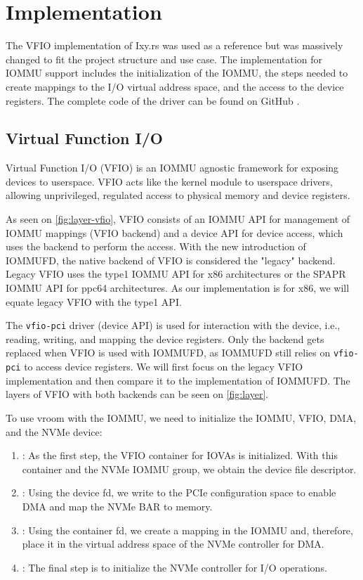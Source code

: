 \chapter{Implementation} \label{c:impl}

The VFIO implementation of Ixy.rs was used as a reference but was massively changed to fit the project structure and use case. The implementation for IOMMU support includes the initialization of the IOMMU, the steps needed to create mappings to the I/O virtual address space, and the access to the device registers. The complete code of the driver can be found on GitHub \cite{vroomsource}.

\section{Virtual Function I/O}
Virtual Function I/O (VFIO) is an IOMMU agnostic framework for exposing devices to userspace. VFIO acts like the kernel module to userspace drivers, allowing unprivileged, regulated access to physical memory and device registers.

As seen on \autoref{fig:layer-vfio}, VFIO consists of an IOMMU API for management of IOMMU mappings (VFIO backend) and a device API for device access, which uses the backend to perform the access. With the new introduction of IOMMUFD, the native backend of VFIO is considered the "legacy" backend. Legacy VFIO uses the type1 IOMMU API for x86 architectures or the SPAPR IOMMU API for ppc64 architectures. As our implementation is for x86, we will equate legacy VFIO with the type1 API.

The \texttt{vfio-pci} driver (device API) is used for interaction with the device, i.e., reading, writing, and mapping the device registers. Only the backend gets replaced when VFIO is used with IOMMUFD, as IOMMUFD still relies on \texttt{vfio-pci} to access device registers. We will first focus on the legacy VFIO implementation and then compare it to the implementation of IOMMUFD.
The layers of VFIO with both backends can be seen on \autoref{fig:layer}.

To use vroom with the IOMMU, we need to initialize the IOMMU, VFIO, DMA, and the NVMe device:
\begin{enumerate}
    \item \textbf{}: As the first step, the VFIO container for IOVAs is initialized. With this container and the NVMe IOMMU group, we obtain the device file descriptor.
    \item \textbf{}: Using the device fd, we write to the PCIe configuration space to enable DMA and map the NVMe BAR to memory.
    \item \textbf{}: Using the container fd, we create a mapping in the IOMMU and, therefore, place it in the virtual address space of the NVMe controller for DMA.
    \item \textbf{}: The final step is to initialize the NVMe controller for I/O operations.
\end{enumerate}

